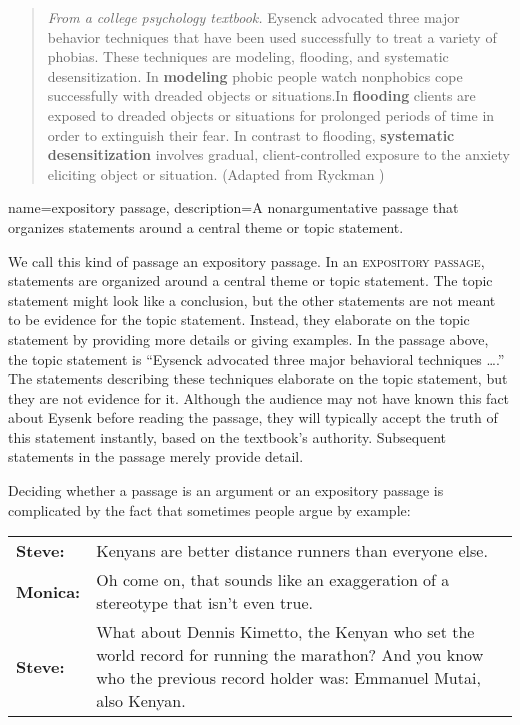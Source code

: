 \begin{quotation}\noindent\textit{From a college psychology textbook.} Eysenck advocated three major behavior techniques that have been used successfully to treat a variety of phobias. These techniques are modeling, flooding, and systematic desensitization. In \textbf{modeling} phobic people watch nonphobics cope successfully with dreaded objects or situations.In \textbf{flooding} clients are exposed to dreaded objects or situations for prolonged periods of time in order to extinguish their fear. In contrast to flooding, \textbf{systematic desensitization} involves gradual, client-controlled exposure to the anxiety eliciting object or situation. (Adapted from Ryckman \cite*{Ryckman2007}) \end{quotation}

{
name=expository passage,
description={A nonargumentative passage that organizes statements around a central theme or topic statement.}
}

We call this kind of passage an expository passage. In an \textsc{\gls{expository passage}}, \label{def:expository_passage} statements are organized around a central theme or topic statement. The topic statement might look like a conclusion, but the other statements are not meant to be evidence for the topic statement. Instead, they elaborate on the topic statement by providing more details or giving examples. In the passage above, the topic statement is ``Eysenck advocated three major behavioral techniques \ldots.'' The statements describing these techniques elaborate on the topic statement, but they are not evidence for it. Although the audience may not have known this fact about Eysenk before reading the passage, they will typically accept the truth of this statement instantly, based on the textbook's authority. Subsequent statements in the passage merely provide detail. 

Deciding whether a passage is an argument or an expository passage is complicated by the fact that sometimes people argue by example: 

\begin{adjustwidth}{2em}{0em}
\begin{longtabu}{p{.1\linewidth}p{.8\linewidth}}
\textbf{Steve:} & Kenyans are better distance runners than everyone else. \\
\textbf{Monica:} & Oh come on, that sounds like an exaggeration of a stereotype that isn't even true.\\
\textbf{Steve:} & What about Dennis Kimetto, the Kenyan who set the world record for running the marathon? And you know who the previous record holder was: Emmanuel Mutai, also Kenyan. \\
\end{longtabu}
\end{adjustwidth}
\vspace{-1.5cm}

